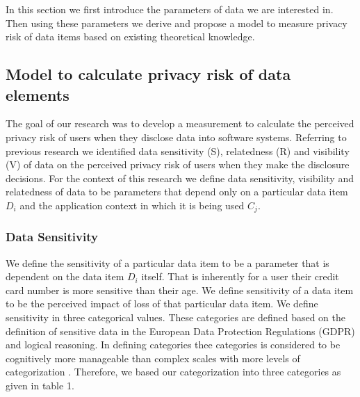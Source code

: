 \documentclass[10pt]{article}
\begin{document}
In this section we first introduce the parameters of data we are interested in. Then using these parameters we derive and propose a model to measure privacy risk of data items based on existing theoretical knowledge.

\subsection {Model to calculate privacy risk of data elements}

The goal of our research was to develop a measurement to calculate the perceived privacy risk of users when they disclose data into software systems. Referring to previous research we identified data sensitivity (S), relatedness (R) and visibility (V) of data on the perceived privacy risk of users when they make the disclosure decisions. For the context of this research we define data sensitivity, visibility and relatedness of data to be parameters that depend only on a particular data item \textit{$D_i$} and the application context in which it is being used \textit{$C_j$}. 

\subsubsection{Data Sensitivity} 

We define the sensitivity of a particular data item to be a parameter that is dependent on the data item \textit{$D_i$} itself. That is inherently for a user their credit card number is more sensitive than their age. We define sensitivity of a data item to be the perceived impact of loss of that particular data item. We define sensitivity in three categorical values. These categories are defined based on the definition of sensitive data in the European Data Protection Regulations (GDPR) \cite {wagner2016national} and logical reasoning. In defining categories thee categories is considered to be cognitively more manageable than complex scales with more levels of categorization \cite {oetzel2014systematic}. Therefore, we based our categorization into three categories as given in table 1.
\end{document}
